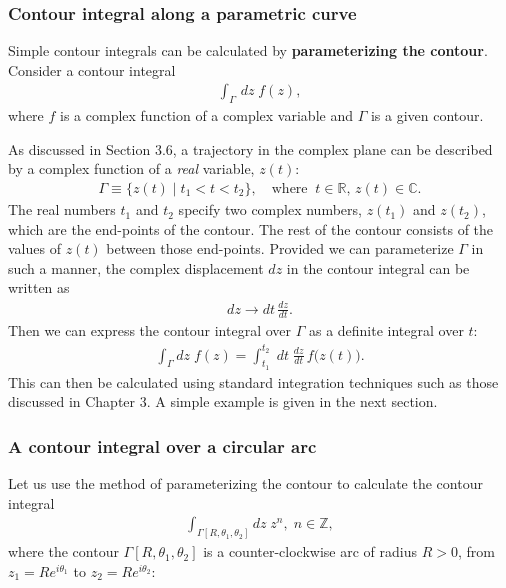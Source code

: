 \documentclass[10pt,a4paper]{article}
\begin{document}
\subsubsection{Contour integral along a parametric curve}
\label{contour-integral-along-a-parametric-curve}

Simple contour integrals can be calculated by \textbf{parameterizing
  the contour}.  Consider a contour integral
\begin{align*}
  \int_\Gamma \, dz \; f(z),
\end{align*}
where $f$ is a complex function of a complex variable and $\Gamma$ is
a given contour.

As discussed in Section 3.6, a trajectory in the complex plane can be
described by a complex function of a \textit{real} variable, $z(t)$:
\begin{align}
  \Gamma \equiv \Big\{z(t) \;\Big|\; t_1 < t < t_2\Big\}, \quad \mathrm{where}\;\; t \in \mathbb{R}, \,z(t) \in \mathbb{C}.
\end{align}
The real numbers $t_1$ and $t_2$ specify two complex numbers, $z(t_1)$
and $z(t_2)$, which are the end-points of the contour. The rest of the
contour consists of the values of $z(t)$ between those
end-points. Provided we can parameterize $\Gamma$ in such a manner,
the complex displacement $dz$ in the contour integral can be written
as
\begin{align}
  dz \rightarrow dt\, \frac{dz}{dt}.
\end{align}
Then we can express the contour integral over $\Gamma$ as a definite
integral over $t$:
\begin{align}
  \int_\Gamma dz\; f(z) = \int_{t_1}^{t_2} \; dt\; \frac{dz}{dt}\, f\big(z(t)\big).
\end{align}
This can then be calculated using standard integration techniques such
as those discussed in Chapter 3. A simple example is given in the next
section.

\subsubsection{A contour integral over a circular arc}
\label{arc-contour}

Let us use the method of parameterizing the contour to calculate the
contour integral
\begin{align}
  \int_{\Gamma[R, \theta_1,\theta_2]} dz\; z^n,\; n\in\mathbb{Z},
\end{align}
where the contour $\Gamma[R, \theta_1,\theta_2]$ is a
counter-clockwise arc of radius $R > 0$, from $z_1 = R e^{i\theta_1}$
to $z_2 = R e^{i\theta_2}$:
\end{document}
